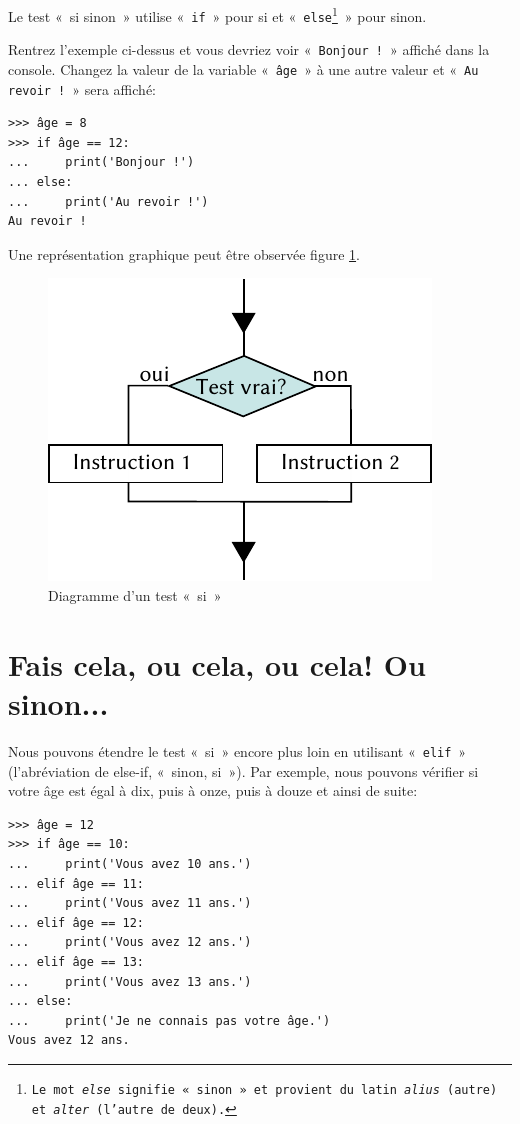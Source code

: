 Le test «~si sinon~» utilise «~\texttt{if}~» pour si et «~\texttt{else\footnote{Le mot \emph{else} signifie «~sinon~» et provient du latin \emph{alius} (autre) et \emph{alter} (l'autre de deux).}}~» pour sinon.

Rentrez l'exemple ci-dessus et vous devriez voir «~\texttt{Bonjour !}~» affiché dans la console.
Changez la valeur de la variable «~\texttt{âge}~»  à une autre valeur et «~\texttt{Au revoir !}~»  sera affiché:

\begin{Verbatim}[frame=single,rulecolor=\color{green}, label=à taper avec attention]
>>> âge = 8
>>> if âge == 12:
...     print('Bonjour !')
... else:
...     print('Au revoir !')
Au revoir !
\end{Verbatim}

Une représentation graphique peut être observée figure \ref{fig:Cf-else-fr}.

\begin{figure}[ht]
\centering
\includegraphics[scale=1.5]{images/Cf-else-fr.pdf}
\caption{Diagramme d'un test «~si~»}
\label{fig:Cf-else-fr}
\end{figure}


\section{Fais cela, ou cela, ou cela! Ou sinon...}
Nous pouvons étendre le test «~si~» encore plus loin en utilisant «~\texttt{elif}~» (l'abréviation  de else-if, «~sinon, si~»). Par exemple, nous pouvons vérifier si votre âge est égal à dix, puis à onze, puis à douze et ainsi de suite: 

\begin{Verbatim}[frame=single,rulecolor=\color{green}, label=à taper avec attention]
>>> âge = 12
>>> if âge == 10:
...     print('Vous avez 10 ans.')
... elif âge == 11:
...     print('Vous avez 11 ans.')
... elif âge == 12:
...     print('Vous avez 12 ans.')
... elif âge == 13:
...     print('Vous avez 13 ans.')
... else:
...     print('Je ne connais pas votre âge.')
Vous avez 12 ans.
\end{Verbatim}

